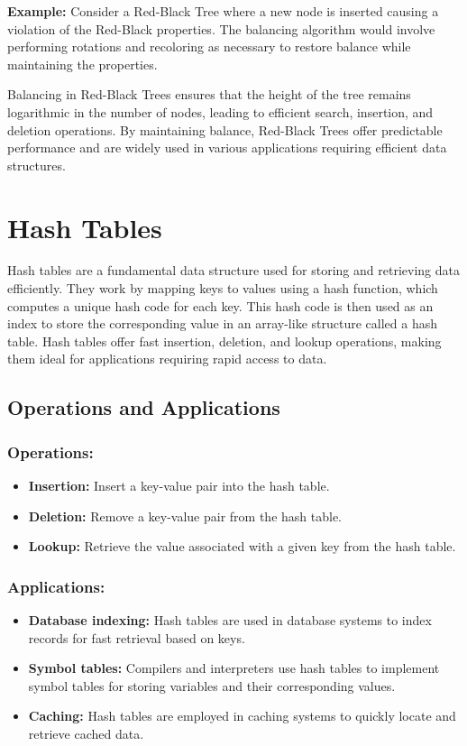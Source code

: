 \documentclass[12pt]{book} %
\begin{document}
\textbf{Example:} Consider a Red-Black Tree where a new node is inserted causing a violation of the Red-Black properties. The balancing algorithm would involve performing rotations and recoloring as necessary to restore balance while maintaining the properties.

Balancing in Red-Black Trees ensures that the height of the tree remains logarithmic in the number of nodes, leading to efficient search, insertion, and deletion operations. By maintaining balance, Red-Black Trees offer predictable performance and are widely used in various applications requiring efficient data structures.


\section{Hash Tables}

Hash tables are a fundamental data structure used for storing and retrieving data efficiently. They work by mapping keys to values using a hash function, which computes a unique hash code for each key. This hash code is then used as an index to store the corresponding value in an array-like structure called a hash table. Hash tables offer fast insertion, deletion, and lookup operations, making them ideal for applications requiring rapid access to data.

\subsection{Operations and Applications}

\subsubsection{Operations:}
\begin{itemize}
    \item \textbf{Insertion:} Insert a key-value pair into the hash table.
    \item \textbf{Deletion:} Remove a key-value pair from the hash table.
    \item \textbf{Lookup:} Retrieve the value associated with a given key from the hash table.
\end{itemize}

\subsubsection{Applications:}
\begin{itemize}
    \item \textbf{Database indexing:} Hash tables are used in database systems to index records for fast retrieval based on keys.
    \item \textbf{Symbol tables:} Compilers and interpreters use hash tables to implement symbol tables for storing variables and their corresponding values.
    \item \textbf{Caching:} Hash tables are employed in caching systems to quickly locate and retrieve cached data.
\end{itemize}
\end{document}
